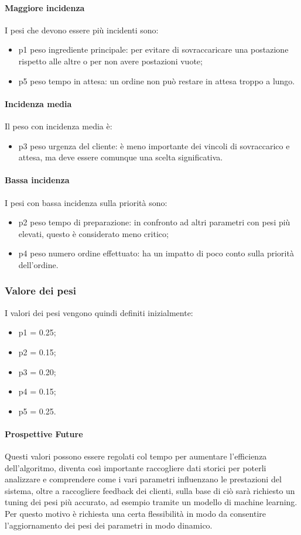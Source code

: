\paragraph{Maggiore incidenza} I pesi che devono essere più incidenti sono:
\begin{itemize}
	\item p1 peso ingrediente principale: per evitare di sovraccaricare una postazione rispetto alle altre o per non avere postazioni vuote;
	\item p5 peso tempo in attesa: un ordine non può restare in attesa troppo a lungo.
\end{itemize}

\paragraph{Incidenza media} Il peso con incidenza media è:
\begin{itemize}
	\item p3 peso urgenza del cliente: è meno importante dei vincoli di sovraccarico e attesa, ma deve essere comunque una scelta significativa.
\end{itemize}

\paragraph{Bassa incidenza} I pesi con bassa incidenza sulla priorità sono:
\begin{itemize}
	\item p2 peso tempo di preparazione: in confronto ad altri parametri con pesi più elevati, questo è considerato meno critico;
	\item p4 peso numero ordine effettuato: ha un impatto di poco conto sulla priorità dell’ordine.
\end{itemize}

\subsubsection{Valore dei pesi}
I valori dei pesi vengono quindi definiti inizialmente:
\begin{itemize}
	\item p1 = 0.25;
	\item p2 = 0.15;
	\item p3 = 0.20;
	\item p4 = 0.15;
	\item p5 = 0.25.
\end{itemize}
\paragraph{Prospettive Future} Questi valori possono essere regolati col tempo per aumentare l’efficienza dell’algoritmo, diventa così importante raccogliere dati storici per poterli analizzare e comprendere come i vari parametri influenzano le prestazioni del sistema, oltre a raccogliere feedback dei clienti, sulla base di ciò sarà richiesto un tuning dei pesi più accurato, ad esempio tramite un modello di machine learning. Per questo motivo è richiesta una certa flessibilità in modo da consentire l'aggiornamento dei pesi dei parametri in modo dinamico.

